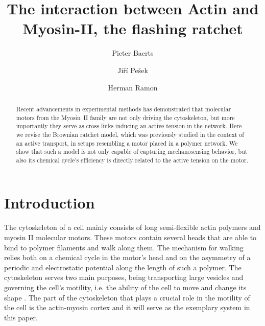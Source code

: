 \documentclass[aps,pre,twocolumn,showpacs,showkeys,superscriptaddress,floatfix]{revtex4-1}
\begin{document}
 

\title{The interaction between Actin and Myosin-II, the flashing ratchet}
\author{Pieter Baerts}
\author{Jiří Pešek}
\author{Herman Ramon}

\begin{abstract}
Recent advancements in experimental methods has demonstrated that molecular motors from the Myosin~II family are not only driving the cytoskeleton, 
but more importantly they serve as cross-links inducing an active tension in the network. 
Here we revise the Brownian ratchet model, 
which was previously studied in the context of an active transport, 
in setups resembling a motor placed in a polymer network.
We show that such a model is not only capable of capturing mechanosensing behavior,
but also its chemical cycle's efficiency is directly related to the active tension on the motor.  
\end{abstract}

\maketitle 

\section{Introduction}

The cytoskeleton of a cell mainly consists of long semi-flexible actin polymers and myosin II molecular motors\cite{mitchison1996actin}. 
These motors contain several heads that are able to bind to polymer filaments and walk along them\cite{pollard1982structure}. 
The mechanism for walking relies both on a chemical cycle in the motor's head and on the asymmetry of a periodic and electrostatic potential along the length of such a polymer\cite{Reimann2002introduction}. 
The cytoskeleton serves two main purposes, being transporting large vesicles and governing the cell's motility, i.e. the ability of the cell to move and change its shape \cite{ross2008cargo,mitchison1996actin}.
The part of the cytoskeleton that plays a crucial role in the motility of the cell is the actin-myosin cortex \cite{vicente2009non} and it will serve as the exemplary system in this paper.
\end{document}
